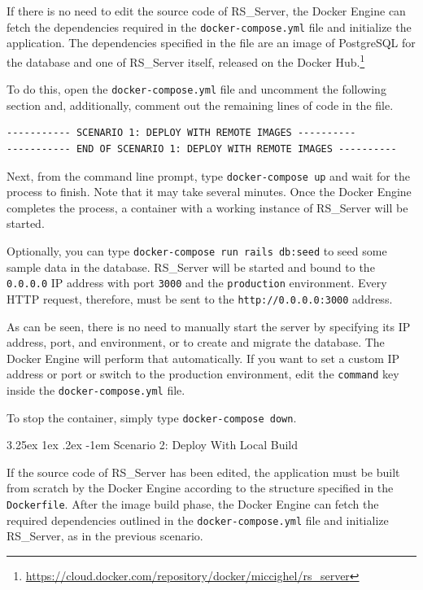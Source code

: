 \documentclass[a4paper, english]{article}
\makeatletter
\renewcommand\paragraph{\@startsection{paragraph}{5}{\z@}%
  {3.25ex \@plus1ex \@minus.2ex}%
  {-1em}%
  {\normalfont\normalsize\bfseries}}
\newcommand{\rsserver}{RS\_Server\xspace}
\makeatother
\begin{document}
If there is no need to edit the source code of \rsserver, the Docker Engine can fetch the dependencies required in the \verb|docker-compose.yml| file and initialize the application. The dependencies specified in the file are an image of PostgreSQL for the database and one of \rsserver itself, released on the Docker Hub.\footnote{\url{https://cloud.docker.com/repository/docker/miccighel/rs_server}}

To do this, open the \verb|docker-compose.yml| file and uncomment the following section and, additionally, comment out the remaining lines of code in the file.
\begin{verbatim}
----------- SCENARIO 1: DEPLOY WITH REMOTE IMAGES ----------
----------- END OF SCENARIO 1: DEPLOY WITH REMOTE IMAGES ----------
\end{verbatim} 

Next, from the command line prompt, type \verb|docker-compose up| and wait for the process to finish. Note that it may take several minutes. 
Once the Docker Engine completes the process, a container with a working instance of \rsserver will be started.

Optionally, you can type \verb|docker-compose run rails db:seed| to seed some sample data in the database. \rsserver will be started and bound 
to the \verb|0.0.0.0| IP address with port \verb|3000| and the \verb|production| environment. Every HTTP request, therefore, must be sent to 
the \verb|http://0.0.0.0:3000| address.

As can be seen, there is no need to manually start the server by specifying its IP address, port, and environment, or to create and migrate 
the database. The Docker Engine will perform that automatically. If you want to set a custom IP address or port or switch 
to the production environment, edit the \verb|command| key inside the \verb|docker-compose.yml| file.

To stop the container, simply type \verb|docker-compose down|.

\paragraph{Scenario 2: Deploy With Local Build}

If the source code of \rsserver has been edited, the application must be built from scratch by the Docker Engine according to the structure 
specified in the \verb|Dockerfile|. After the image build phase, the Docker Engine can fetch the required dependencies outlined in 
the \verb|docker-compose.yml| file and initialize \rsserver, as in the previous scenario.
\end{document}
